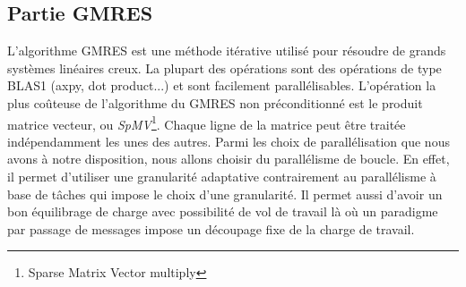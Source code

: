 \subsection{Partie GMRES}
L'algorithme GMRES est une méthode itérative utilisé pour résoudre de grands systèmes linéaires creux.
%
La plupart des opérations sont des opérations de type BLAS1 (axpy, dot product...) et sont facilement parallélisables\cite{para_blas}.
%
L'opération la plus coûteuse de l'algorithme du GMRES non préconditionné est le produit matrice vecteur, ou {\em SpMV}\footnote{Sparse Matrix Vector multiply}.
%
Chaque ligne de la matrice peut être traitée indépendamment les unes des autres.
%
Parmi les choix de parallélisation que nous avons à notre disposition, nous allons choisir du parallélisme de boucle\cite{para_spmv}.
%
En effet, il permet d'utiliser une granularité adaptative contrairement au parallélisme à base de tâches qui impose le choix d'une granularité.
%
Il permet aussi d'avoir un bon équilibrage de charge avec possibilité de vol de travail là où un paradigme par passage de messages impose un découpage fixe de la charge de travail.



